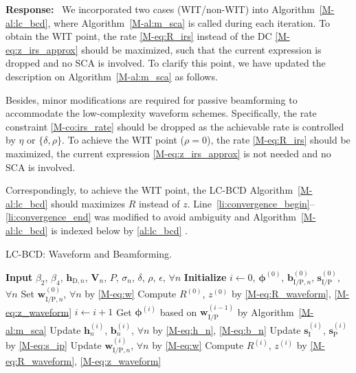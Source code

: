 \documentclass{article}
\newcounter{reviewer}
\newcounter{point}[reviewer]
\newcounter{response}[reviewer]
\newenvironment{response}
	{\refstepcounter{response} \medskip \noindent \textbf{Response:}\ }
	{\medskip}
\begin{document}
\begin{reviewer}
		\begin{response}
			We incorporated two cases (WIT/non-WIT) into Algorithm~\ref{M-al:lc_bcd}, where Algorithm~\ref{M-al:m_sca} is called during each iteration. To obtain the WIT point, the rate \eqref{M-eq:R_irs} instead of the DC \eqref{M-eq:z_irs_approx} should be maximized, such that the current expression is dropped and no SCA is involved. To clarify this point, we have updated the description on Algorithm~\ref{M-al:m_sca} as follows.
			\begin{framed}
				Besides, minor modifications are required for passive beamforming to accommodate the low-complexity waveform schemes. Specifically, the rate constraint \eqref{M-co:irs_rate} should be dropped as the achievable rate is controlled by $\eta$ or $\{\delta,\rho\}$. To achieve the WIT point ($\rho=0$), the rate \eqref{M-eq:R_irs} should be maximized, the current expression \eqref{M-eq:z_irs_approx} is not needed and no SCA is involved.
			\end{framed}
			Correspondingly, to achieve the WIT point, the LC-BCD Algorithm~\ref{M-al:lc_bcd} should maximizes $R$ instead of $z$. Line~\ref{li:convergence_begin}--\ref{li:convergence_end} was modified to avoid ambiguity and Algorithm~\ref{M-al:lc_bcd} is indexed below by \ref{al:lc_bcd} .
			\begin{algorithm}[!h]
				\caption{LC-BCD: Waveform and Beamforming.}
				\label{al:lc_bcd}
				\begin{algorithmic}[1]
					\State \textbf{Input} $\beta_2$, $\beta_4$, $\boldsymbol{h}_{\mathrm{D},n}$, $\boldsymbol{V}_{n}$, $P$, $\sigma_n$, $\delta$, $\rho$, $\epsilon$, $\forall n$
					\State \textbf{Initialize} $i \gets 0$, $\boldsymbol{\phi}^{(0)}$, $\boldsymbol{b}_{\mathrm{I/P},n}^{(0)}$, $\boldsymbol{s}_{\mathrm{I/P}}^{(0)}$, $\forall n$
					\State Set $\boldsymbol{w}_{\mathrm{I/P},n}^{(0)}$, $\forall n$ by \eqref{M-eq:w}
					\State Compute $R^{(0)}$, $z^{(0)}$ by \eqref{M-eq:R_waveform}, \eqref{M-eq:z_waveform}
					\Repeat
						\State $i \gets i + 1$
						\State Get $\boldsymbol{\phi}^{(i)}$ based on $\boldsymbol{w}_{\mathrm{I/P}}^{(i-1)}$ by Algorithm~\ref{M-al:m_sca}
						\State Update $\boldsymbol{h}_n^{(i)}$, $\boldsymbol{b}_n^{(i)}$, $\forall n$ by \eqref{M-eq:h_n}, \eqref{M-eq:b_n}
						\State Update $\boldsymbol{s}_{\mathrm{I}}^{(i)}$, $\boldsymbol{s}_{\mathrm{P}}^{(i)}$ by \eqref{M-eq:s_ip}
						\State Update $\boldsymbol{w}_{\mathrm{I/P},n}^{(i)}$, $\forall n$ by \eqref{M-eq:w}
						\State Compute $R^{(i)}$, $z^{(i)}$ by \eqref{M-eq:R_waveform}, \eqref{M-eq:z_waveform}

\end{algorithmic}
\end{algorithm}
\end{response}
\end{reviewer}
\end{document}
